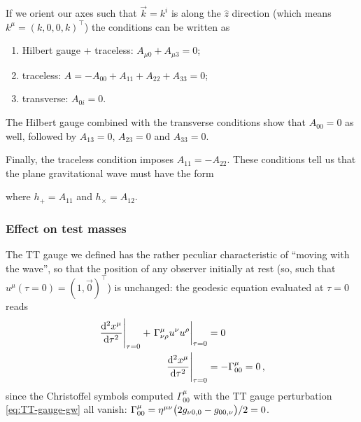 \documentclass[main.tex]{subfiles}
\begin{document}
If we orient our axes such that \(\vec{k} = k^{i}\) is along the \(\hat{z}\) direction (which means \(k^{\mu } = (k, 0, 0, k)^{\top}\)) the conditions can be written as 
\begin{enumerate}
    \item Hilbert gauge + traceless: \(A_{\mu 0}+ A_{\mu 3} = 0\);
    \item traceless: \(A = - A_{00} + A_{11} + A_{22} + A_{33} = 0 \);
    \item transverse: \(A_{0i} = 0\). 
\end{enumerate}

The Hilbert gauge combined with the transverse conditions show that \(A_{00} = 0\) as well, followed by \(A_{13} = 0\), \(A_{23} = 0\) and \(A_{33} = 0\). 

Finally, the traceless condition imposes \(A_{11} = - A_{22} \).
These conditions tell us that the plane gravitational wave must have the form 
%

%
%
where \(h_+ = A_{11} \) and \(h_\times = A_{12} \). 

\subsubsection{Effect on test masses}

The \ac{TT} gauge we defined has the rather peculiar characteristic of ``moving with the wave'', so that the position of any observer initially at rest (so, such that \(u^{\mu } (\tau = 0 ) = (1, \vec{0})^{\top}\)) is unchanged: the geodesic equation evaluated at \(\tau = 0\) reads
%
\begin{align}
\eval{\dv[2]{x^{\mu }}{\tau}}_{\tau = 0} + \eval{\Gamma^{\mu }_{\nu \rho } u^{\nu } u^{\rho }}_{\tau = 0} &= 0   \\
\eval{\dv[2]{x^{\mu }}{\tau}}_{\tau = 0} &= - \Gamma^{\mu }_{00} = 0 
\,,
\end{align}
%
since the Christoffel symbols computed \(\Gamma^{\mu }_{00}\) with the \ac{TT} gauge perturbation \eqref{eq:TT-gauge-gw} all vanish: \(\Gamma^{\mu }_{00} = \eta^{\mu \nu } \qty( 2 g_{\nu 0,0} - g_{00, \nu }) / 2 =  0\).
\end{document}
